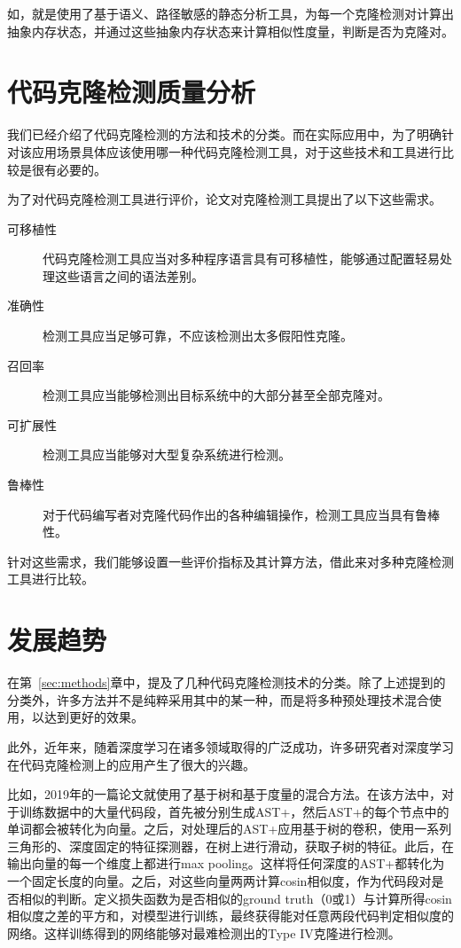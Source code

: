 \documentclass[UTF8]{ctexart}
\begin{document}
如\cite{Kim2011}，就是使用了基于语义、路径敏感的静态分析工具，为每一个克隆检测对计算出抽象内存状态，并通过这些抽象内存状态来计算相似性度量，判断是否为克隆对。


\section{代码克隆检测质量分析}
我们已经介绍了代码克隆检测的方法和技术的分类。而在实际应用中，为了明确针对该应用场景具体应该使用哪一种代码克隆检测工具，对于这些技术和工具进行比较是很有必要的。

为了对代码克隆检测工具进行评价，论文\cite{Min2019}对克隆检测工具提出了以下这些需求。

\begin{description}
	\item[可移植性] 代码克隆检测工具应当对多种程序语言具有可移植性，能够通过配置轻易处理这些语言之间的语法差别。
	\item[准确性] 检测工具应当足够可靠，不应该检测出太多假阳性克隆。
	\item[召回率] 检测工具应当能够检测出目标系统中的大部分甚至全部克隆对。
	\item[可扩展性] 检测工具应当能够对大型复杂系统进行检测。
	\item[鲁棒性] 对于代码编写者对克隆代码作出的各种编辑操作，检测工具应当具有鲁棒性。
\end{description}

针对这些需求，我们能够设置一些评价指标及其计算方法，借此来对多种克隆检测工具进行比较。

\section{发展趋势}
在第~\ref{sec:methods}章中，提及了几种代码克隆检测技术的分类。除了上述提到的分类外，许多方法并不是纯粹采用其中的某一种，而是将多种预处理技术混合使用，以达到更好的效果。

此外，近年来，随着深度学习在诸多领域取得的广泛成功，许多研究者对深度学习在代码克隆检测上的应用产生了很大的兴趣。

比如，2019年的一篇论文\cite{Yu2019}就使用了基于树和基于度量的混合方法。在该方法中，对于训练数据中的大量代码段，首先被分别生成AST+，然后AST+的每个节点中的单词都会被转化为向量。之后，对处理后的AST+应用基于树的卷积，使用一系列三角形的、深度固定的特征探测器，在树上进行滑动，获取子树的特征。此后，在输出向量的每一个维度上都进行max pooling。这样将任何深度的AST+都转化为一个固定长度的向量。之后，对这些向量两两计算cosin相似度，作为代码段对是否相似的判断。定义损失函数为是否相似的ground truth（0或1）与计算所得cosin相似度之差的平方和，对模型进行训练，最终获得能对任意两段代码判定相似度的网络。这样训练得到的网络能够对最难检测出的Type IV克隆进行检测。




\end{document}
